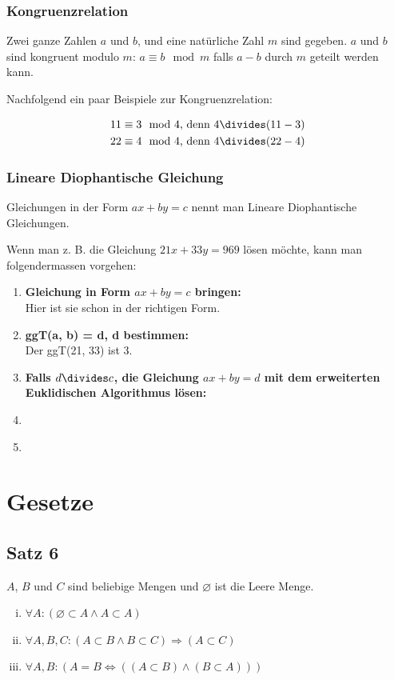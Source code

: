 \documentclass[12pt, a4paper, oneside]{article}
\begin{document}
\subsubsection{Kongruenzrelation}
Zwei ganze Zahlen $a$ und $b$, und eine natürliche Zahl $m$ sind gegeben. $a$ und $b$ sind kongruent modulo $m$: $a \equiv b \mod m $ falls $a - b$ durch $m$ geteilt werden kann.

Nachfolgend ein paar Beispiele zur Kongruenzrelation:

\begin{equation*}
  \begin{split}
    11 \equiv 3 & \mod 4 \text{, denn } 4 \divides (11 - 3)\\
    22 \equiv 4 & \mod 4 \text{, denn } 4 \divides (22 - 4)
  \end{split}
\end{equation*}

 
\subsubsection{Lineare Diophantische Gleichung}
Gleichungen in der Form $ax + by = c$ nennt man Lineare Diophantische Gleichungen.

Wenn man z. B. die Gleichung $21x + 33y = 969$ lösen möchte, kann man folgendermassen vorgehen:
\begin{enumerate}[1.)]
  \item \textbf{Gleichung in Form $ax + by = c$ bringen:}  \\
  Hier ist sie schon in der richtigen Form.
  \item \textbf{ggT(a, b) = d, d bestimmen:} \\
  Der ggT(21, 33) ist 3.
  \item \textbf{Falls $d \divides c$, die Gleichung $ax + by = d$ mit dem erweiterten Euklidischen Algorithmus lösen:}\\
  \item \textbf{} \\
  \item 
  
\end{enumerate} 

%
%
\newpage
\section{Gesetze}
\subsection{Satz 6}
$A$, $B$ und $C$ sind beliebige Mengen und $\varnothing$ ist die Leere Menge.
\begin{enumerate}[(i)]
  \item $\forall A : (\varnothing \subset A \land A \subset A) $
  \item $\forall A, B, C : (A \subset B \land B \subset C) \Longrightarrow (A \subset C)$
  \item $\forall A, B : (A = B \Longleftrightarrow ((A \subset B) \land (B \subset A)))$
  
\end{enumerate}
\end{document}
